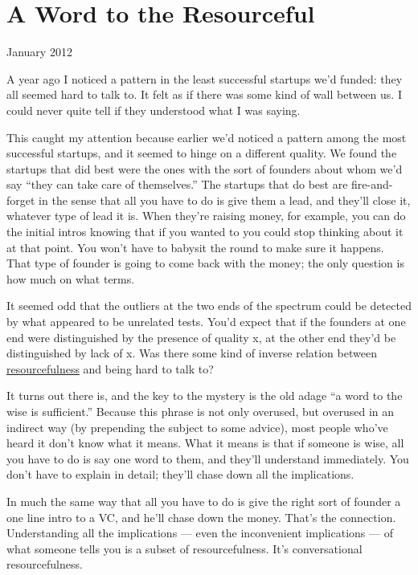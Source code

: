 \chapter{A Word to the Resourceful}

January 2012

A year ago I noticed a pattern in the least successful startups we'd
funded: they all seemed hard to talk to. It felt as if there was some
kind of wall between us. I could never quite tell if they understood
what I was saying.

This caught my attention because earlier we'd noticed a pattern among
the most successful startups, and it seemed to hinge on a different
quality. We found the startups that did best were the ones with the sort
of founders about whom we'd say ``they can take care of themselves.''
The startups that do best are fire-and-forget in the sense that all you
have to do is give them a lead, and they'll close it, whatever type of
lead it is. When they're raising money, for example, you can do the
initial intros knowing that if you wanted to you could stop thinking
about it at that point. You won't have to babysit the round to make sure
it happens. That type of founder is going to come back with the money;
the only question is how much on what terms.

It seemed odd that the outliers at the two ends of the spectrum could be
detected by what appeared to be unrelated tests. You'd expect that if
the founders at one end were distinguished by the presence of quality x,
at the other end they'd be distinguished by lack of x. Was there some
kind of inverse relation between \href{relres.html}{resourcefulness} and
being hard to talk to?

It turns out there is, and the key to the mystery is the old adage ``a
word to the wise is sufficient.'' Because this phrase is not only
overused, but overused in an indirect way (by prepending the subject to
some advice), most people who've heard it don't know what it means. What
it means is that if someone is wise, all you have to do is say one word
to them, and they'll understand immediately. You don't have to explain
in detail; they'll chase down all the implications.

In much the same way that all you have to do is give the right sort of
founder a one line intro to a VC, and he'll chase down the money. That's
the connection. Understanding all the implications --- even the
inconvenient implications --- of what someone tells you is a subset of
resourcefulness. It's conversational resourcefulness.

